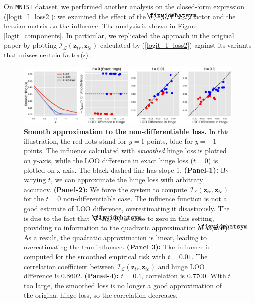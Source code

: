 \documentclass{article}
\newcommand\lowerwidehatsym{%
  \text{\smash{\raisebox{-1.3ex}{%
    $\fixwidehatsym$}}}}
\newcommand\fixwidehat[1]{%
  \mathchoice
    {\accentset{\displaystyle\lowerwidehatsym}{#1}}
    {\accentset{\textstyle\lowerwidehatsym}{#1}}
    {\accentset{\scriptstyle\lowerwidehatsym}{#1}}
    {\accentset{\scriptscriptstyle\lowerwidehatsym}{#1}}
}
\begin{document}
On \href{http://yann.lecun.com/exdb/mnist/}{\texttt{MNIST}} dataset, we performed another analysis on the closed-form expression (\ref{logit_I_loss2}): we examined the effect of the $\sigma(-y_{tr}\fixwidehat{\bm{\theta}}^{\top}\bm{x}_{tr})$ factor and the hessian matrix on the influence. The analysis is shown in Figure \ref{logit_components}. In particular, we replicated the approach in the original paper by plotting $\mathcal{I}_{\mathcal{L}}(\bm{z}_{tr}, \bm{z}_{te})$ calculated by (\ref{logit_I_loss2}) against its variants that misses certain factor(s). 

\setcounter{figure}{3}
\begin{figure}[h]
\vskip 0.0in
\begin{center}
\centerline{\includegraphics[width=2.1\columnwidth]{fig-svm}}
\vskip -0.1in
\caption{\textbf{Smooth approximation to the non-differentiable loss.}  In this illustration, the red dots stand for $y=1$ points, blue for $y=-1$ points. The influence calculated with \emph{smoothed} hinge loss is plotted on y-axis, while the LOO difference in exact hinge loss ($t=0$) is plotted on x-axis. The black-dashed line has slope 1. \textbf{(Panel-1):} By varying $t$, we can approximate the hinge loss with arbitrary accuracy. \textbf{(Panel-2):} We force the system to compute $\mathcal{I}_{\mathcal{L}}(\bm{z}_{tr}, \bm{z}_{te})$ for the $t=0$ non-differentiable case. The influence function is not a good estimate of LOO difference, overestimating it disastrously. The is due to the fact that $\nabla^2 R_{\text{sv}}(\fixwidehat{\bm{\theta}})$ is close to zero in this setting, providing no information to the quadratic approximation of $\mathcal{L}(\bm{z}, \fixwidehat{\bm{\theta}})$. As a result, the quadratic approximation is linear, leading to overestimating the true influence. \textbf{(Panel-3):} The influence is computed for the smoothed empirical risk with $t=0.01$. The correlation coefficient between $\mathcal{I}_{\mathcal{L}}(\bm{z}_{tr}, \bm{z}_{te})$ and hinge LOO difference is $0.8602$. \textbf{(Panel-4):} $t=0.1$, correlation is $0.7700$. With $t$ too large, the smoothed loss is no longer a good approximation of the original hinge loss, so the correlation decreases.}
\label{smoothsvm}
\end{center}
\vskip -0.25in
\end{figure}
\end{document}
